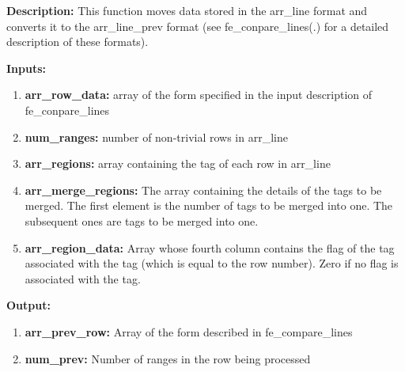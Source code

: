 \documentclass[a4paper, oneside,11pt]{article}
\begin{document}
\textbf{Description:}
    This function moves data stored in the arr\_line format and converts it to the arr\_line\_prev format (see fe\_conpare\_lines(.) for a detailed description of these formats).
    
\textbf{Inputs:}
\begin{enumerate}
    \item \textbf{arr\_row\_data:} array of the form specified in the input description of fe\_conpare\_lines
    \item \textbf{num\_ranges:} number of non-trivial rows in arr\_line
    \item \textbf{arr\_regions:} array containing the tag of each row in arr\_line
    \item \textbf{arr\_merge\_regions:} The array containing the details of the tags to be merged. The first element is the number of tags to be merged into one. The subsequent ones are tags to be merged into one.
    \item \textbf{arr\_region\_data:} Array whose fourth column contains the flag of the tag associated with the tag (which is equal to the row number). Zero if no flag is associated with the tag.
\end{enumerate}

\textbf{Output:}
\begin{enumerate}
    \item \textbf{arr\_prev\_row:} Array of the form described in fe\_compare\_lines
    \item \textbf{num\_prev:} Number of ranges in the row being processed
\end{enumerate}

    
    
\end{document}

